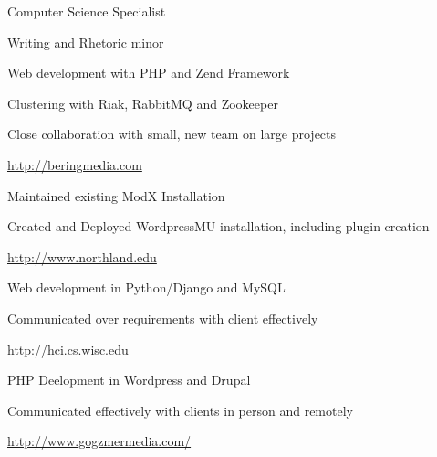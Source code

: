 \documentclass[letterpaper,11pt,notitlepage]{article}
\begin{document}

\vbar
{}
    \begin{employment}
        \item Computer Science Specialist
        \item Writing and Rhetoric minor
    \end{employment}
\vbar
{}
        \begin{employment}
            \item Web development with PHP and Zend Framework
            \item Clustering with Riak, RabbitMQ and
            Zookeeper
            \item Close collaboration with small, new team on large  projects
            \item \url{http://beringmedia.com}
        \end{employment}
        \begin{employment}
            \item Maintained existing ModX Installation
            \item Created and Deployed WordpressMU installation, including plugin creation
            \item \url{http://www.northland.edu}
        \end{employment}
        \begin{employment}
            \item Web development in Python/Django and MySQL
            \item Communicated over requirements with client effectively
            \item \url{http://hci.cs.wisc.edu}
        \end{employment}
        \begin{employment}
            \item PHP Deelopment in Wordpress and Drupal
            \item Communicated effectively with clients in person and remotely
            \item \url{http://www.gogzmermedia.com/}
        \end{employment}
\end{document}

